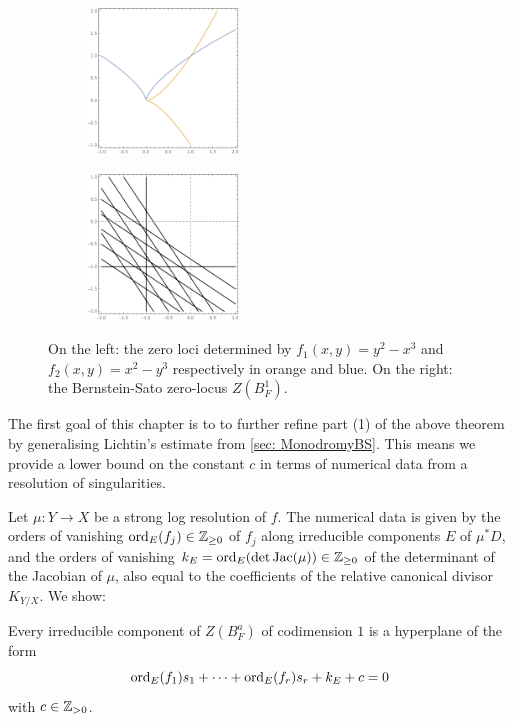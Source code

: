     \begin{figure}
      \centering
      \begin{subfigure}{0.45\textwidth}
        \centering
        \includegraphics[width  = 4cm]{Figures/KissingCusps}
      \end{subfigure}
      \begin{subfigure}{0.45\textwidth}
        \centering
          \includegraphics[width = 4cm]{Figures/2CuspsBS}
      \end{subfigure}
      \caption{On the left: the zero loci determined by $f_1(x,y) = y^2 -x^3$ and $f_2(x,y) = x^2 -y^3$ respectively in orange and blue.
      On the right: the
      Bernstein-Sato zero-locus $Z(B_F^1)$.}
      \label{figure: TwoCusps}
    \end{figure}


The first goal of this chapter is to to further refine part (1) of the above theorem by generalising Lichtin's estimate from \cref{sec: MonodromyBS}.
This means we provide a lower bound on the constant $c$ in terms of numerical data from a resolution of singularities.

Let $\mu:Y\to X$ be a strong log resolution of $f$.
The numerical data is given by the orders of vanishing $\operatorname{ord}_{E}(f_j)\in\mathbb{Z}_{\geq 0}$ of $f_j$ along irreducible components $E$ of $\mu^*D$, and the orders of vanishing $k_E=\operatorname{ord}_{E}(\det \operatorname{Jac}(\mu))\in\mathbb{Z}_{\geq 0}$ of the determinant of the Jacobian of $\mu$, also equal to the coefficients of the relative canonical divisor $K_{Y/X}$. We show:
\begin{theorem}\label{thm: MainTheorem}
  Every irreducible component of $Z(B_F^a)$ of codimension $1$ is a hyperplane of the form
  $$\operatorname{ord}_{E}(f_1)s_1 + \cdots + \operatorname{ord}_{E}(f_r)s_r + k_E + c=0 $$
with $c\in\mathbb{Z}_{>0}$.
\end{theorem}

